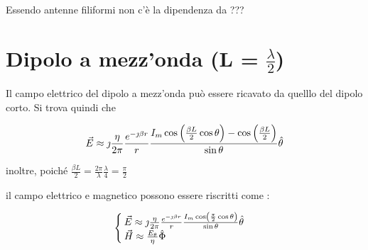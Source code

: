 Essendo antenne filiformi non c'è la dipendenza da ???



\section{Dipolo a mezz'onda (L = $\frac{\lambda}{2}$)}

Il campo elettrico del dipolo a mezz'onda può essere ricavato da quelllo del dipolo corto. Si trova quindi che

\begin{equation}
\vec{E} \approx \jmath \frac{\eta}{2 \pi} \frac{e^{-\jmath \beta r}}{r} \frac{I_m \cos \left(\frac{\beta L}{2} \cos \theta \right) - \cos \left(\frac{\beta L}{2} \right)}{\sin \theta} \hat{\theta}
\end{equation}

inoltre, poiché $\frac{\beta L}{2} = \frac{2 \pi}{\lambda} \frac{\lambda}{4} = \frac{\pi}{2}$

il campo elettrico e magnetico possono essere riscritti come :

\begin{equation}\begin{cases}
  \vec{E} \approx \jmath \frac{\eta}{2 \pi} \frac{e^{-\jmath \beta r}}{r} \frac{I_m \cos \left(\frac{\pi}{2} \cos \theta \right)}{\sin \theta} \hat{\theta} \\
  \vec{H} \approx \frac{E_{\theta}}{\eta} \hat{\Phi}
\end{cases}\end{equation}

